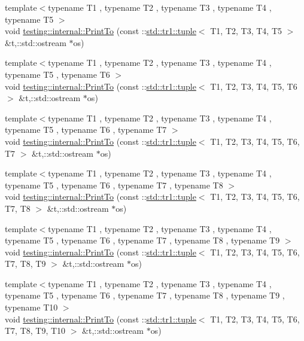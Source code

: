 \begin{DoxyCompactItemize}
\item 
{\footnotesize template$<$typename T1 , typename T2 , typename T3 , typename T4 , typename T5 $>$ }\\void \hyperlink{namespacetesting_1_1internal_adc2a693cdb33cd4d3881e4c8b16d9865}{testing\-::internal\-::\-Print\-To} (const \-::\hyperlink{classstd_1_1tr1_1_1tuple}{std\-::tr1\-::tuple}$<$ T1, T2, T3, T4, T5 $>$ \&t,\-::std\-::ostream $\ast$os)
\item 
{\footnotesize template$<$typename T1 , typename T2 , typename T3 , typename T4 , typename T5 , typename T6 $>$ }\\void \hyperlink{namespacetesting_1_1internal_a205f62732d75b884f0668eb4483b2a58}{testing\-::internal\-::\-Print\-To} (const \-::\hyperlink{classstd_1_1tr1_1_1tuple}{std\-::tr1\-::tuple}$<$ T1, T2, T3, T4, T5, T6 $>$ \&t,\-::std\-::ostream $\ast$os)
\item 
{\footnotesize template$<$typename T1 , typename T2 , typename T3 , typename T4 , typename T5 , typename T6 , typename T7 $>$ }\\void \hyperlink{namespacetesting_1_1internal_aa3a910677d224678f1074520bc4f625f}{testing\-::internal\-::\-Print\-To} (const \-::\hyperlink{classstd_1_1tr1_1_1tuple}{std\-::tr1\-::tuple}$<$ T1, T2, T3, T4, T5, T6, T7 $>$ \&t,\-::std\-::ostream $\ast$os)
\item 
{\footnotesize template$<$typename T1 , typename T2 , typename T3 , typename T4 , typename T5 , typename T6 , typename T7 , typename T8 $>$ }\\void \hyperlink{namespacetesting_1_1internal_a0f47a6e3634be969039e1e6eb902934f}{testing\-::internal\-::\-Print\-To} (const \-::\hyperlink{classstd_1_1tr1_1_1tuple}{std\-::tr1\-::tuple}$<$ T1, T2, T3, T4, T5, T6, T7, T8 $>$ \&t,\-::std\-::ostream $\ast$os)
\item 
{\footnotesize template$<$typename T1 , typename T2 , typename T3 , typename T4 , typename T5 , typename T6 , typename T7 , typename T8 , typename T9 $>$ }\\void \hyperlink{namespacetesting_1_1internal_ad15d6fe963a626de83caee897c8221bc}{testing\-::internal\-::\-Print\-To} (const \-::\hyperlink{classstd_1_1tr1_1_1tuple}{std\-::tr1\-::tuple}$<$ T1, T2, T3, T4, T5, T6, T7, T8, T9 $>$ \&t,\-::std\-::ostream $\ast$os)
\item 
{\footnotesize template$<$typename T1 , typename T2 , typename T3 , typename T4 , typename T5 , typename T6 , typename T7 , typename T8 , typename T9 , typename T10 $>$ }\\void \hyperlink{namespacetesting_1_1internal_ab4c216410a9d9080b63f19a31a18c76a}{testing\-::internal\-::\-Print\-To} (const \-::\hyperlink{classstd_1_1tr1_1_1tuple}{std\-::tr1\-::tuple}$<$ T1, T2, T3, T4, T5, T6, T7, T8, T9, T10 $>$ \&t,\-::std\-::ostream $\ast$os)

\end{DoxyCompactItemize}
